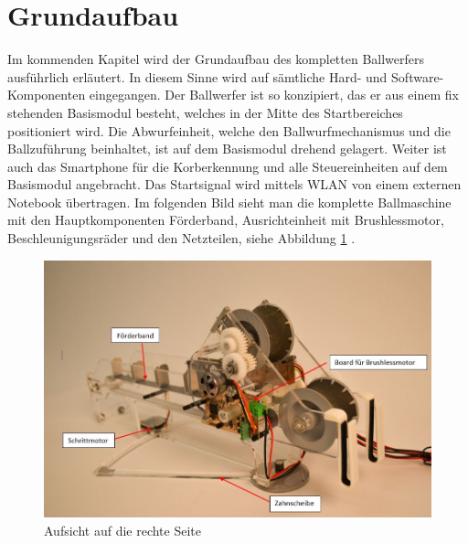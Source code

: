 \section{Grundaufbau}
	Im kommenden Kapitel wird der Grundaufbau des kompletten Ballwerfers ausführlich erläutert. 
	In diesem Sinne wird auf sämtliche Hard- und Software-Komponenten eingegangen.
    Der Ballwerfer ist so konzipiert, das er aus einem fix stehenden Basismodul besteht, 
    welches in der Mitte des Startbereiches positioniert wird. Die Abwurfeinheit, welche 
    den Ballwurfmechanismus und die Ballzuführung beinhaltet, ist auf dem Basismodul 
    drehend gelagert. Weiter ist auch das Smartphone für die Korberkennung und alle 
    Steuereinheiten auf dem Basismodul angebracht. Das Startsignal wird mittels WLAN 
    von einem externen Notebook übertragen. Im folgenden Bild sieht man die komplette Ballmaschine mit den Hauptkomponenten Förderband,
    Ausrichteinheit mit Brushlessmotor, Beschleunigungsräder und den Netzteilen, siehe 
    Abbildung \ref{abb:Ballmaschine} .
    \begin{figure}[h!]
    	\includegraphics[width=1\textwidth,clip,trim=0mm 0mm 0mm 20mm]
    	{Enddokumentation/Bilder/Geraeteuebersicht_2.jpg}
    	\centering
    	\caption{Aufsicht auf die rechte Seite}
    	\label{abb:Ballmaschine}
    \end{figure}
    
